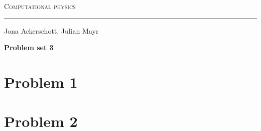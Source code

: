 \documentclass[12pt, a4paper]{article}
\begin{document}
\centerline{\Huge\scshape Computational physics}
\vspace*{0.5cm}
\hrule
\vspace*{0.5cm}
\centerline{Jona Ackerschott, Julian Mayr}
\vspace*{1cm}
\centerline{\Large\bfseries Problem set 3}
\vspace*{0.5cm}

\section*{Problem 1}

\section*{Problem 2}
\end{document}
